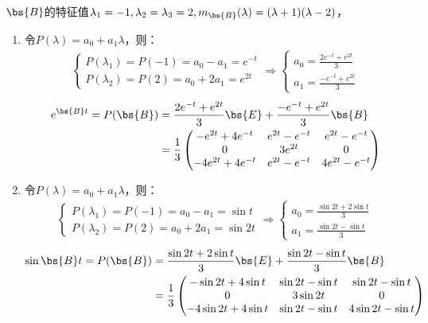 \documentclass[12pt, a4paper, oneside, UTF8]{ctexbook}
\begin{document}
\begin{solution}
    $\bs{B}$的特征值$\lambda_1=-1,\lambda_2=\lambda_3=2,m_{\bs{B}}(\lambda)=(\lambda+1)(\lambda-2)$，
    \begin{enumerate}[label=(\arabic*)]
        \item 令$P(\lambda)=a_0+a_1\lambda$，则：
        \begin{align*}
        \left\{
            \begin{array}{ll}
                P(\lambda_1)=P(-1)=a_0-a_1=e^{-t}\\
                P(\lambda_2)=P(2)=a_0+2a_1=e^{2t}
            \end{array}
            \right.
        \Rightarrow
        \left\{
            \begin{array}{ll}
                a_0=\frac{2e^{-t}+e^{2t}}{3}\\
                a_1=\frac{-e^{-t}+e^{2t}}{3}
            \end{array}
            \right.
        \end{align*}
        \begin{align*}
            e^{\bs{B}t}=P(\bs{B})
        &=\frac{2e^{-t}+e^{2t}}{3}\bs{E}+\frac{-e^{-t}+e^{2t}}{3}\bs{B}\\
        &=\frac{1}{3}\begin{pmatrix}
            -e^{2t}+4e^{-t} &e^{2t}-e^{-t} &e^{2t}-e^{-t} \\
            0 & 3e^{2t}& 0\\
            -4e^{2t}+4e^{-t}&e^{2t}-e^{-t}&4e^{2t}-e^{-t}
        \end{pmatrix}
        \end{align*}
        \item 令$P(\lambda)=a_0+a_1\lambda$，则：
        \begin{align*}
        \left\{
            \begin{array}{ll}
                P(\lambda_1)=P(-1)=a_0-a_1=\sin t\\
                P(\lambda_2)=P(2)=a_0+2a_1=\sin 2t
            \end{array}
            \right.
            \Rightarrow
            \left\{
                \begin{array}{ll}
                    a_0=\frac{\sin 2t+2\sin t}{3}\\
                    a_1=\frac{\sin 2t-\sin t}{3}
                \end{array}
                \right.
        \end{align*}
        \begin{align*}
            \sin \bs{B}t=P(\bs{B})
        &=\frac{\sin 2t+2\sin t}{3}\bs{E}+\frac{\sin 2t-\sin t}{3}\bs{B}\\
        &=\frac{1}{3}\begin{pmatrix}
            -\sin 2t +4\sin t &\sin 2t-\sin t &\sin 2t-\sin t\\
            0 & 3\sin 2t& 0\\
            -4\sin 2t+4\sin t&\sin 2t-\sin t&4\sin 2t -\sin t
        \end{pmatrix}
    \end{align*}
    \end{enumerate}
\end{solution}
\end{document}
